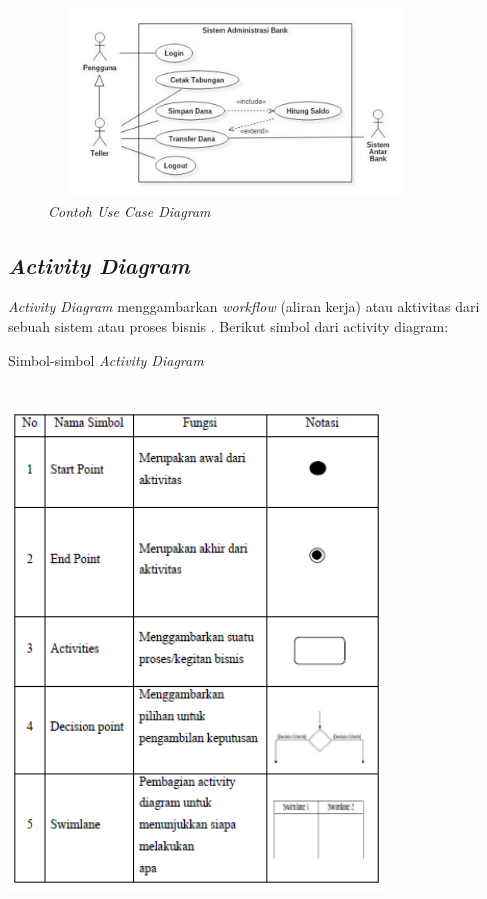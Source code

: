\begin{figure}[H]
	\centering
	\includegraphics[width=10cm,height=5cm]{gambar/contohusecase}
	\caption{\textit{Contoh \textit{Use Case Diagram}}}
	\label{contoh_usecase}
\end{figure}

\subsection{\emph{Activity Diagram}} 

\emph{Activity Diagram} menggambarkan \textit{workflow} (aliran kerja) atau aktivitas dari sebuah sistem atau proses bisnis \cite{AdeHendini}. Berikut simbol dari activity diagram:

\begin{table}[H]
	\centering
	\caption{Simbol-simbol \emph{Activity Diagram} \cite{AdeHendini}}
	\includegraphics[width=10cm,height=14cm]{gambar/simbolactivity}
	\label{tabel_karaktermax2}
\end{table}

